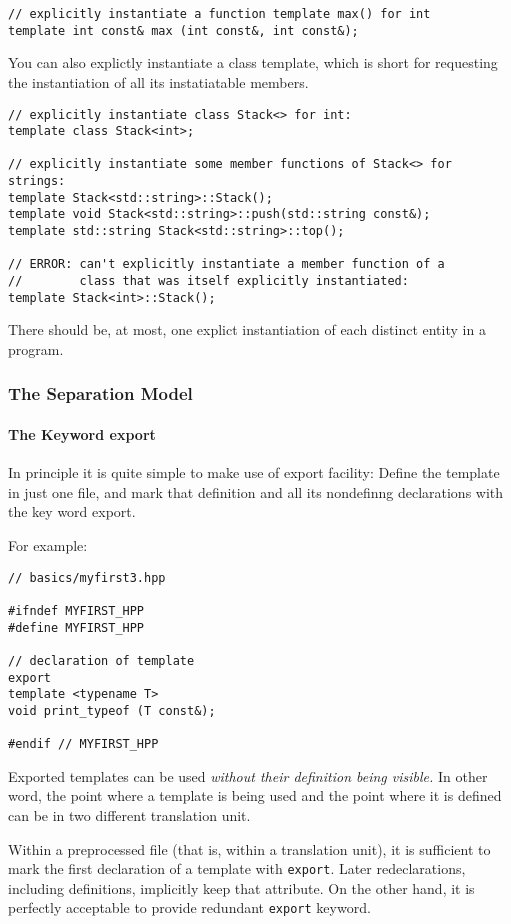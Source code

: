 \documentclass[11pt, a4paper]{book}
\begin{document}
\begin{itemize}
\begin{verbatim}
// explicitly instantiate a function template max() for int 
template int const& max (int const&, int const&); 
\end{verbatim}
You can also explictly instantiate a class template, which is short for requesting the instantiation of all its instatiatable members. 
\begin{verbatim}
// explicitly instantiate class Stack<> for int: 
template class Stack<int>; 

// explicitly instantiate some member functions of Stack<> for strings: 
template Stack<std::string>::Stack(); 
template void Stack<std::string>::push(std::string const&); 
template std::string Stack<std::string>::top(); 

// ERROR: can't explicitly instantiate a member function of a 
//        class that was itself explicitly instantiated: 
template Stack<int>::Stack(); 
\end{verbatim}
There should be, at most, one explict instantiation of each distinct entity in a program.
\subsubsection{The Separation Model}
\paragraph{The Keyword export}

In principle it is quite simple to make use of export facility: Define the template in just one file, and mark that definition and all its nondefinng declarations with the key word export. 

For example:
\begin{verbatim}
// basics/myfirst3.hpp 

#ifndef MYFIRST_HPP 
#define MYFIRST_HPP 

// declaration of template 
export 
template <typename T> 
void print_typeof (T const&); 

#endif // MYFIRST_HPP 
\end{verbatim}
Exported templates can be used \emph{without their definition being visible.} In other word, the point where a template is being used and the point where it is defined can be in two different translation unit. 

Within a preprocessed file (that is, within a translation unit), it is sufficient to mark the first declaration of a template with \verb|export|. Later redeclarations, including definitions, implicitly keep that attribute. On the other hand, it is perfectly acceptable to provide redundant \verb|export| keyword.


\end{itemize}
\end{document}
